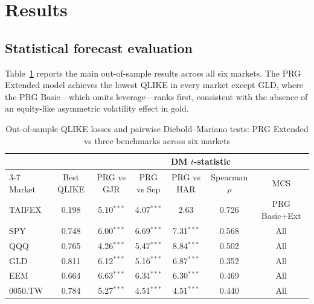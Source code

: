 \documentclass[11pt,a4paper]{article}
\begin{document}
\section{Results}

\subsection{Statistical forecast evaluation}

Table~\ref{tab:main_results} reports the main out-of-sample results across all six markets. The PRG Extended model achieves the lowest QLIKE in every market except GLD, where the PRG Basic---which omits leverage---ranks first, consistent with the absence of an equity-like asymmetric volatility effect in gold.

\begin{table}[htbp]
\centering
\caption{Out-of-sample QLIKE losses and pairwise Diebold--Mariano tests: PRG Extended vs three benchmarks across six markets}
\label{tab:main_results}
\small
\begin{tabular}{lcccccc}
\toprule
 & & \multicolumn{5}{c}{DM $t$-statistic} \\
\cmidrule(lr){3-7}
Market & Best QLIKE & PRG vs GJR & PRG vs Sep & PRG vs HAR & Spearman $\rho$ & MCS \\
\midrule
TAIFEX  & 0.198 & 5.10$^{***}$ & 4.07$^{***}$ & 2.63 & 0.726 & PRG Basic+Ext \\
SPY     & 0.748 & 6.00$^{***}$ & 6.69$^{***}$ & 7.31$^{***}$ & 0.568 & All \\
QQQ     & 0.765 & 4.26$^{***}$ & 5.47$^{***}$ & 8.84$^{***}$ & 0.502 & All \\
GLD     & 0.811 & 6.12$^{***}$ & 5.16$^{***}$ & 6.87$^{***}$ & 0.352 & All \\
EEM     & 0.664 & 6.63$^{***}$ & 6.34$^{***}$ & 6.30$^{***}$ & 0.469 & All \\
0050.TW & 0.784 & 5.27$^{***}$ & 4.51$^{***}$ & 4.51$^{***}$ & 0.440 & All \\
\bottomrule
\end{tabular}
\begin{flushleft}
\footnotesize

\end{flushleft}
\end{table}
\end{document}
